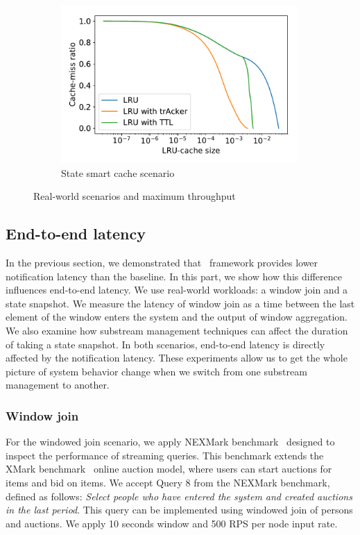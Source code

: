\begin{figure}[t!]
\begin{subfigure}[b]{0.25\textwidth}
            \includegraphics[width=0.99\textwidth]{pics/dgc_lru_depth_search.pdf}
            \caption{State smart cache scenario}
            \label{fig:dgc_lru_depth_search}
    \end{subfigure}
    \caption{Real-world scenarios and maximum throughput}
    \label{various_experiments}
\end{figure}

\subsection{End-to-end latency}

In the previous section, we demonstrated that \tracker\ framework provides lower notification latency than the baseline. In this part, we show how this difference influences end-to-end latency. We use real-world workloads: a window join and a state snapshot. We measure the latency of window join as a time between the last element of the window enters the system and the output of window aggregation. We also examine how substream management techniques can affect the duration of taking a state snapshot. In both scenarios, end-to-end latency is directly affected by the notification latency. These experiments allow us to get the whole picture of system behavior change when we switch from one substream management to another.

\subsubsection{Window join}
For the windowed join scenario, we apply NEXMark benchmark~\cite{tucker2008nexmark} designed to inspect the performance of streaming queries. This benchmark extends the XMark benchmark~\cite{schmidt2002xmark} online auction model, where users can start auctions for items and bid on items. We accept Query 8 from the NEXMark benchmark, defined as follows: {\em Select people who have entered the system and created auctions in the last period}. This query can be implemented using windowed join of persons and auctions. We apply 10 seconds window and 500 RPS per node input rate.

